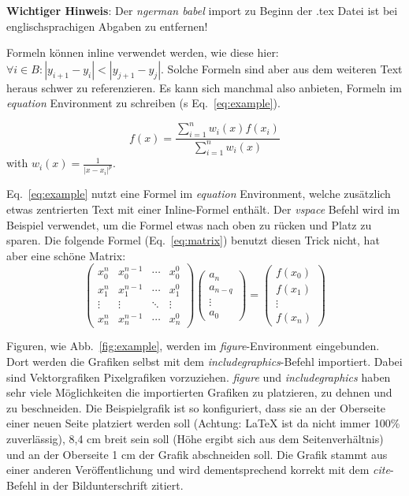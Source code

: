 \documentclass[runningheads,a4paper]{uwsese}
\begin{document}
\textbf{Wichtiger Hinweis}: Der \emph{ngerman babel} import zu Beginn der .tex Datei ist bei englischsprachigen Abgaben zu entfernen!

Formeln können inline verwendet werden, wie diese hier: $\forall i \in B : |y_{i+1} - y_i| < |y_{j+1} - y_j|$. Solche Formeln sind aber aus dem weiteren Text heraus schwer zu referenzieren. Es kann sich manchmal also anbieten, Formeln im \emph{equation} Environment zu schreiben (s Eq.~\ref{eq:example}).

\vspace{-6mm}
\begin{center}
	\begin{equation}
	f(x) = \frac{\sum_{i=1}^{n} w_i(x) f(x_i)}{\sum_{i=1}^{n} w_i(x)}
	\label{eq:example}
	\end{equation}
	with $w_i(x) = \frac{1}{|x - x_i|^p}$.
\end{center}

Eq.~\ref{eq:example} nutzt eine Formel im \emph{equation} Environment, welche zusätzlich etwas zentrierten Text mit einer Inline-Formel enthält. Der \emph{vspace} Befehl wird im Beispiel verwendet, um die Formel etwas nach oben zu rücken und Platz zu sparen. Die folgende Formel (Eq.~\ref{eq:matrix}) benutzt diesen Trick nicht, hat aber eine schöne Matrix:
\begin{equation}
\begin{pmatrix}
x_0^n & x_0^{n-1} & \cdots & x_0^0 \\
x_1^n & x_1^{n-1} & \cdots & x_1^0 \\
\vdots & \vdots & \ddots & \vdots \\
x_n^n & x_n^{n-1} & \cdots & x_n^0
\end{pmatrix}
\begin{pmatrix}
a_n \\
a_{n-q} \\
\vdots\\
a_0
\end{pmatrix}
=
\begin{pmatrix}
f(x_0) \\
f(x_1) \\
\vdots\\
f(x_n)
\end{pmatrix}
\label{eq:matrix}
\end{equation}

Figuren, wie Abb.~\ref{fig:example}, werden im \emph{figure}-Environment eingebunden. Dort werden die Grafiken selbst mit dem \emph{includegraphics}-Befehl importiert. Dabei sind Vektorgrafiken Pixelgrafiken vorzuziehen. \emph{figure} und \emph{includegraphics} haben sehr viele Möglichkeiten die importierten Grafiken zu platzieren, zu dehnen und zu beschneiden. Die Beispielgrafik ist so konfiguriert, dass sie an der Oberseite einer neuen Seite platziert werden soll (Achtung: LaTeX ist da nicht immer 100\% zuverlässig), 8,4 cm breit sein soll (Höhe ergibt sich aus dem Seitenverhältnis) und an der Oberseite 1 cm der Grafik abschneiden soll. Die Grafik stammt aus einer anderen Veröffentlichung und wird dementsprechend korrekt mit dem \emph{cite}-Befehl in der Bildunterschrift zitiert.
\end{document}
